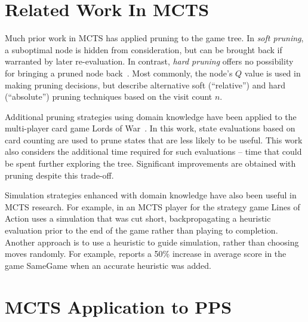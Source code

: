\documentclass[letterpaper]{article}
\begin{document}
\section{Related Work In MCTS}
\label{relatedWork}


Much prior work in MCTS has applied pruning to the game tree. In {\it soft pruning}, a suboptimal node is hidden from consideration, but can be brought back if warranted by later re-evaluation. In contrast, {\it hard pruning} offers no possibility for bringing a pruned node back~\cite{browne2012survey}. Most commonly, the node's $Q$ value is used in making pruning decisions, but \cite{huang2010pruning} describe alternative soft (``relative'') and hard (``absolute'') pruning techniques based on the visit count $n$.

Additional pruning strategies using domain knowledge have been applied to the multi-player card game Lords of War~\cite{sephton2014ieee}. In this work, state evaluations based on card counting are used to prune states that are less likely to be useful. This work also considers the additional time required for such evaluations -- time that could be spent further exploring the tree. Significant improvements are obtained with pruning despite this trade-off.

Simulation strategies enhanced with domain knowledge have also been useful in MCTS research. For example, in \cite{winands2010monte} an MCTS player for the strategy game Lines of Action uses a simulation that was cut short, backpropagating a heuristic evaluation prior to the end of the game rather than playing to completion. Another approach is to use a heuristic to guide simulation, rather than choosing moves randomly. For example, \cite{schadd2012single} reports a 50\% increase in average score in the game SameGame when an accurate heuristic was added.

\section{MCTS Application to PPS}
\end{document}
